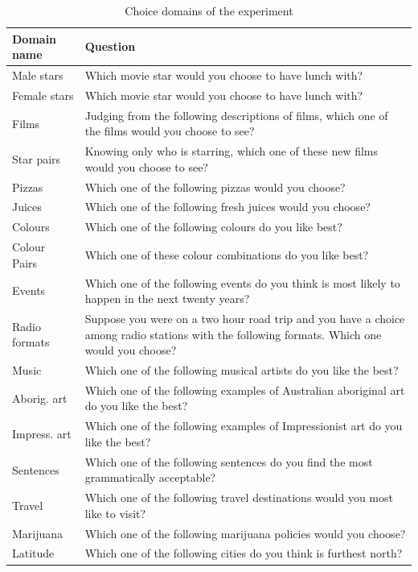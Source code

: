 \documentclass[11pt,letter]{article}
\begin{document}
\begin{table}[h!]
  \begin{center}
    \caption{Choice domains of the experiment}
    \label{t:domains}
    \begin{small}
    \begin{tabular}{lp{12cm}}
      Domain name & Question\\
      \hline
      	Male stars & Which movie star would you choose to have lunch with? \\
		Female stars & Which movie star would you choose to have lunch with? \\
		Films & Judging from the following descriptions of films, which one of the films would you choose to see? \\
		Star pairs & Knowing only who is starring, which one of these new films would you choose to see? \\
		Pizzas & Which one of the following pizzas would you choose? \\
		Juices & Which one of the following fresh juices would you choose? \\
		Colours & Which one of the following colours do you like best? \\
		Colour Pairs & Which one of these colour combinations do you like best? \\
		Events & Which one of the following events do you think is most likely to happen in the next twenty years? \\
		Radio formats & Suppose you were on a two hour road trip and you have a choice among radio stations with the following formats.
Which one would you choose? \\
		Music & Which one of the following musical artists do you like the best? \\
		Aborig. art & Which one of the following examples of Australian aboriginal art do you like the best? \\
		Impress. art & Which one of the following examples of Impressionist art do you like the best? \\
		Sentences & Which one of the following sentences do you find the most grammatically acceptable? \\
		Travel & Which one of the following travel destinations would you most like to visit? \\
		Marijuana & Which one of the following marijuana policies would you choose? \\
		Latitude & Which one of the following cities do you think is furthest north? \\

\end{tabular}
\end{small}
\end{center}
\end{table}
\end{document}
